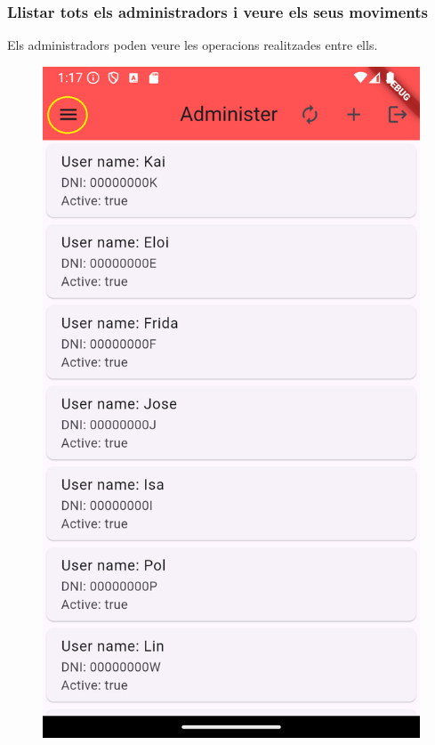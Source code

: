 \documentclass[a4paper,12pt,twoside]{ThesisStyle}
\begin{document}
\clearpage
\subsubsection{Llistar tots els administradors i veure els seus moviments}
\label{subsubsec: Llistar tots els administradors i veure els seus moviments}

Els administradors poden veure les operacions realitzades entre ells.


\begin{figure}[h]
    \centering
    \begin{minipage}{0.31\textwidth}
        \includegraphics[width=\linewidth]{imatges/adminMain.png}

\end{minipage}
\end{figure}
\end{document}
